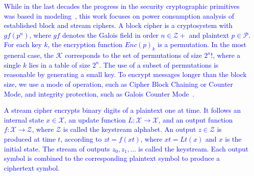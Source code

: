 \documentclass[journal]{IEEEtran}
\newcommand{\rever}{\textcolor{blue}}
\newcommand{\refazer}[1]{{\color{red}{[#1]}}}
\begin{document}
\rever{While in the last decades the progress in the security cryptographic primitives was based in modeling~\cite{KatzL2014}, this work focuses on power consumption analysis of established block and stream ciphers. %
A block cipher is a cryptosystem with $gf(p^n)$, where $gf$ denotes the Galois field in order $n \in \mathcal{Z+}$ and plaintext $p \in \mathcal{P}$.
For each key $k$, the encryption function $Enc(p)_k$ is a permutation. In the most general case, the $\mathcal{K}$ corresponds to the set of permutations of size $2^n!$, where a single $k$ lies in a table of size $2^n$. The use of a subset of permutations is reasonable by generating a small key. To encrypt messages longer than the block size, we use a mode of operation, such as Cipher Block Chaining or Counter Mode, and integrity protection, such as Galois Counter Mode~\cite{KatzL2014}. }


\rever{A stream cipher encrypts binary digits of a plaintext one at time. It follows an internal state $x \in \mathcal{X}$, an update function $L: \mathcal{X} \rightarrow \mathcal{X}$, and an output function $f: \mathcal{X} \rightarrow \mathcal{Z}$, where $\mathcal{Z}$ is called the keystream alphabet. An output $z \in \mathcal{Z}$ is produced at time $t$, according to $zt = f(xt)$, where $xt = Lt(x)$ and $x$ is the initial state. The stream of outputs $z_0, z_1, \ldots$ is called the keystream. Each output symbol is combined to the corresponding plaintext symbol to produce a ciphertext symbol.}
\end{document}

